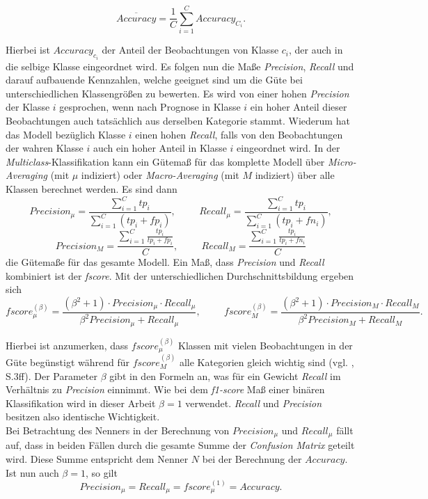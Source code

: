 \documentclass[a4paper,11pt]{article}
\begin{document}
\[\overline{Accuracy} = \frac{1}{C} \sum_{i = 1}^C Accuracy_{C_i} .\]

Hierbei ist $Accuracy_{c_i}$ der Anteil der Beobachtungen von Klasse $c_i$, der auch in die selbige Klasse eingeordnet wird. Es folgen nun die Maße \textit{Precision}, \textit{Recall} und darauf aufbauende Kennzahlen, welche geeignet sind um die Güte bei unterschiedlichen Klassengrößen zu bewerten. Es wird von einer hohen \textit{Precision} der Klasse $i$ gesprochen, wenn nach Prognose in Klasse $i$ ein hoher Anteil dieser Beobachtungen auch tatsächlich aus derselben Kategorie stammt. Wiederum hat das Modell bezüglich Klasse $i$ einen hohen \textit{Recall}, falls von den Beobachtungen der wahren Klasse $i$ auch ein hoher Anteil in Klasse $i$ eingeordnet wird.
In der \textit{Multiclass}-Klassifikation kann ein Gütemaß für das komplette Modell über \textit{Micro-Averaging} (mit $\mu$ indiziert) oder \textit{Macro-Averaging} (mit $M$ indiziert) über alle Klassen berechnet werden. Es sind dann 
\[ Precision_{\mu} = \frac{\sum_{i = 1}^C tp_i}{\sum_{i = 1}^C (tp_i + fp_i)}, \hspace{1cm} Recall_{\mu} = \frac{\sum_{i = 1}^C tp_i}{\sum_{i = 1}^C (tp_i + fn_i)},\]
\[ Precision_M = \frac{\sum_{i = 1}^C \frac{tp_i}{tp_i + fp_i} }{C}, \hspace{1cm} Recall_M = \frac{\sum_{i = 1}^C \frac{tp_i}{tp_i + fn_i} }{C}\]
die Gütemaße für das gesamte Modell. Ein Maß, dass \textit{Precision} und \textit{Recall} kombiniert ist der \textit{fscore}. Mit der unterschiedlichen Durchschnittsbildung ergeben sich
\[ fscore_{\mu}^{(\beta)} = \frac{(\beta^2+1) \cdot Precision_{\mu} \cdot Recall_{\mu}}{\beta^2 Precision_{\mu}+ Recall_{\mu}}, \hspace{1cm} fscore_{M}^{(\beta)} = \frac{(\beta^2+1) \cdot Precision_{M} \cdot Recall_{M}}{\beta^2 Precision_{M}+ Recall_{M}} . \]

Hierbei ist anzumerken, dass $fscore_{\mu}^{(\beta)}$ Klassen mit vielen Beobachtungen in der Güte begünstigt während für $fscore_M^{(\beta)}$ alle Kategorien gleich wichtig sind  (vgl. \cite{sokolova}, S.3ff). Der Parameter $\beta$ gibt in den Formeln an, was für ein Gewicht \textit{Recall} im Verhältnis zu \textit{Precision} einnimmt.
Wie bei dem \textit{f1-score} Maß einer binären Klassifikation wird in dieser Arbeit $\beta = 1$ verwendet. \textit{Recall} und \textit{Precision} besitzen also identische Wichtigkeit. \\
Bei Betrachtung des Nenners in der Berechnung von $Precision_{\mu}$ und $Recall_{\mu}$ fällt auf, dass in beiden Fällen durch die gesamte Summe der \textit{Confusion Matrix} geteilt wird. Diese Summe entspricht dem Nenner $N$ bei der Berechnung der $Accuracy$. Ist nun auch $\beta = 1$, so gilt 
\[Precision_{\mu} =  Recall_{\mu} =  fscore_{\mu}^{(1)} = Accuracy.\]
\end{document}
